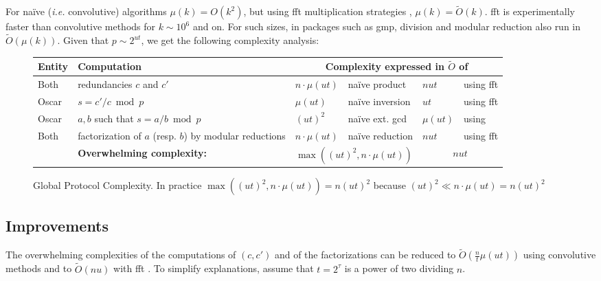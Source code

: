 \documentclass[11pt]{llncs}
\newcommand{\Oapp}{\ensuremath{\tilde{O}}}
\newcommand{\comm}[1]{\marginpar{%
\vskip-\baselineskip %
\raggedright\footnotesize
\itshape\hrule\smallskip#1\par\smallskip\hrule}}
\begin{document}
For na\"{i}ve ({\sl i.e.} convolutive) algorithms $\mu(k) = O(k^2)$, but using {\sc fft} multiplication strategies \cite{schonhage1971schnelle}, $\mu(k) = \Oapp(k)$. {\sc fft} is experimentally faster than convolutive methods for $k \sim 10^6$ and on. For such sizes, in packages such as {\sf gmp}, division and modular reduction also run in $\Oapp(\mu(k))$. Given that $p \sim 2^{ut}$, we get the following complexity analysis:

\comm{"reduction also run in $\Oapp(\mu(k))$"}

\begin{figure}
  \begin{tabularx}{\textwidth}{lXp{1.2cm}p{2.3cm}p{1.2cm}p{2.3cm}}\toprule
{\bf \hfill Entity \hfill \null} & {\bf \hfill Computation \hfill \null} &
    \multicolumn{4}{c}{{\bf Complexity expressed in $\Oapp$ of}} \\\midrule
Both  & redundancies $c$ and $c'$                                        & $n \cdot \mu(u t)$  & na\"{i}ve product & $n u t$  & using {\sc fft}             \\
Oscar & $s = c' / c \bmod p$                                             & $\mu(u t)$    & na\"{i}ve inversion& $u t$    & using {\sc fft}               \\
Oscar & $a,b$ such that $s = a / b \bmod p$                              & $(u t)^2$   & na\"{i}ve ext. {\sc gcd} & $\mu(u t)$ &  using \cite{pan2004rational,wang2003acceleration} \\
Both  & factorization of $a$ (resp. $b$) by modular reductions           & $n \cdot \mu(u t)$  & na\"{i}ve reduction & $n u t$  & using {\sc fft}             \\
      & {\bf Overwhelming complexity:}                                   &
    \multicolumn{2}{c}{$\max((u t)^2,n \cdot \mu(ut))$ }    &
    \multicolumn{2}{c}{$n u t$}              \\\bottomrule
  \end{tabularx}
  \caption{Global Protocol Complexity. In practice $\max((u t)^2,n \cdot \mu(ut))=n(u t)^2$ because $(u t)^2 \ll n \cdot \mu(ut)=n(u t)^2$}
  \label{tab:workload}
\end{figure}


\subsection{Improvements}

The overwhelming complexities of the computations of $(c,c')$ and of the factorizations can be reduced to $\Oapp(\frac{n}{t} \mu(u t))$ using convolutive methods and to $\Oapp(n u)$ with {\sc fft} \cite{schonhage1971schnelle}. To simplify explanations, assume that $t=2^\tau$ is a power of two dividing $n$.
\end{document}
